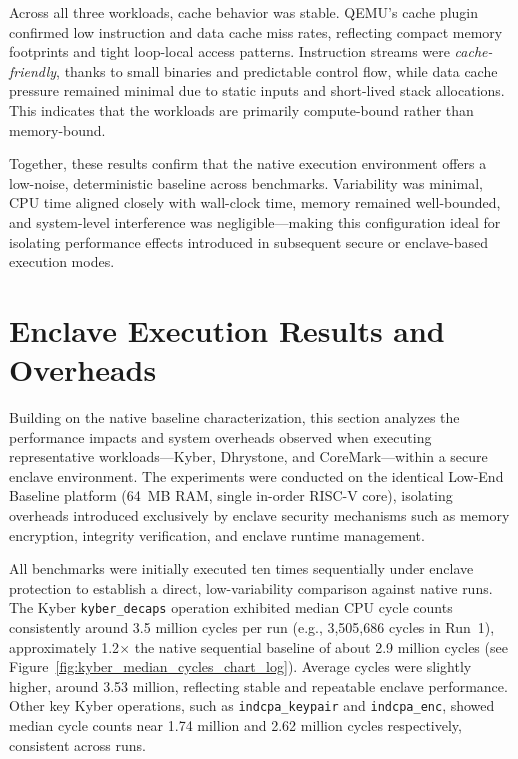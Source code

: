 Across all three workloads, cache behavior was stable. QEMU's cache plugin confirmed low instruction and data cache miss rates, reflecting compact memory footprints and tight loop-local access patterns. Instruction streams were \emph{cache-friendly}, thanks to small binaries and predictable control flow, while data cache pressure remained minimal due to static inputs and short-lived stack allocations. This indicates that the workloads are primarily compute-bound rather than memory-bound.

Together, these results confirm that the native execution environment offers a low-noise, deterministic baseline across benchmarks. Variability was minimal, CPU time aligned closely with wall-clock time, memory remained well-bounded, and system-level interference was negligible—making this configuration ideal for isolating performance effects introduced in subsequent secure or enclave-based execution modes.

\section{Enclave Execution Results and Overheads}
\label{sec:enclave-execution}

Building on the native baseline characterization, this section analyzes the performance impacts and system overheads observed when executing representative workloads—Kyber, Dhrystone, and CoreMark—within a secure enclave environment. The experiments were conducted on the identical Low-End Baseline platform (64~MB RAM, single in-order RISC-V core), isolating overheads introduced exclusively by enclave security mechanisms such as memory encryption, integrity verification, and enclave runtime management.

All benchmarks were initially executed ten times sequentially under enclave protection to establish a direct, low-variability comparison against native runs. The Kyber \texttt{kyber\_decaps} operation exhibited median CPU cycle counts consistently around 3.5 million cycles per run (e.g., 3,505,686 cycles in Run~1), approximately 1.2$\times$ the native sequential baseline of about 2.9 million cycles (see Figure~\ref{fig:kyber_median_cycles_chart_log}). Average cycles were slightly higher, around 3.53 million, reflecting stable and repeatable enclave performance. Other key Kyber operations, such as \texttt{indcpa\_keypair} and \texttt{indcpa\_enc}, showed median cycle counts near 1.74 million and 2.62 million cycles respectively, consistent across runs.

